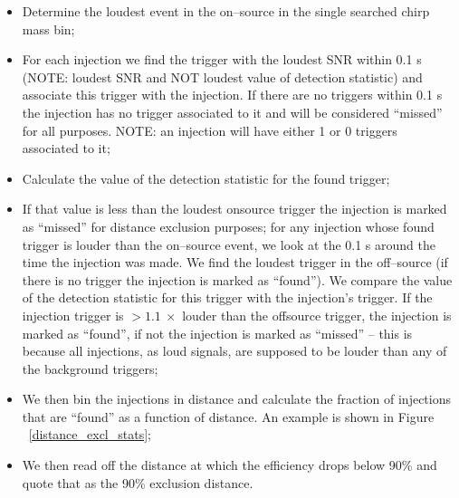 \begin{itemize}
\item
Determine the loudest event in the on--source in the single searched chirp mass bin;
\item
For each injection we find the trigger with the loudest SNR within 0.1 s (NOTE: loudest SNR and NOT loudest value of detection statistic) and associate this trigger with the injection. If there are no triggers within 0.1 s the injection has no trigger associated to it and will be considered ``missed'' for all purposes. NOTE: an injection will have either 1 or 0 triggers associated to it;
\item
Calculate the value of the detection statistic for the found trigger;
\item
If that value is less than the loudest onsource trigger the injection is marked as ``missed'' for distance exclusion purposes; for any injection whose found trigger is louder than the on--source event, we look at the 0.1 s around the time the injection was made. We find the loudest trigger in the off--source (if there is no trigger the injection is marked as ``found''). We compare the value of the detection statistic for this trigger with the injection's trigger. If the injection trigger is $>1.1~\times$ louder than the offsource trigger, the injection is marked as ``found'', if not the injection is marked as ``missed'' -- this is because all injections, as loud signals, are supposed to be louder than any of the background triggers; 
\item
We then bin the injections in distance and calculate the fraction of injections that are ``found'' as a function of distance. An example is shown in Figure ~\ref{distance_excl_stats};
\item
We then read off the distance at which the efficiency drops below 90\% and quote that as the 90\% exclusion distance.
\end{itemize}

